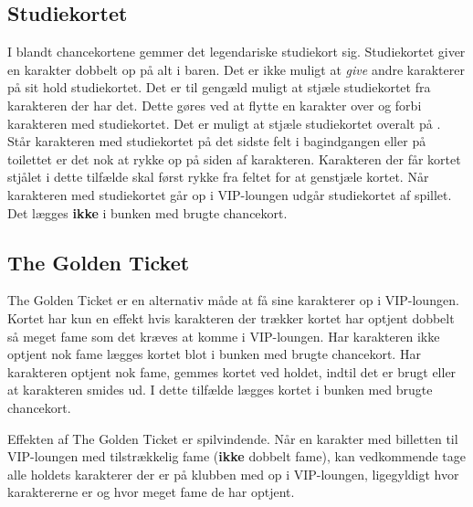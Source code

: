 \subsection{Studiekortet}
I blandt chancekortene gemmer det legendariske studiekort sig. Studiekortet giver en karakter dobbelt op på alt i baren. Det er ikke muligt at \textit{give} andre karakterer på sit hold studiekortet. Det er til gengæld muligt at stjæle studiekortet fra karakteren der har det. Dette gøres ved at flytte en karakter over og forbi karakteren med studiekortet. Det er muligt at stjæle studiekortet overalt på \LeClub . Står karakteren med studiekortet på det sidste felt i bagindgangen eller på toilettet er det nok at rykke op på siden af karakteren. Karakteren der får kortet stjålet i dette tilfælde skal først rykke fra feltet for at genstjæle kortet. Når karakteren med studiekortet går op i VIP-loungen udgår studiekortet af spillet. Det lægges \textbf{ikke} i bunken med brugte chancekort.
\subsection{The Golden Ticket}
The Golden Ticket er en alternativ måde at få sine karakterer op i VIP-loungen. Kortet har kun en effekt hvis karakteren der trækker kortet har optjent dobbelt så meget fame som det kræves at komme i VIP-loungen. Har karakteren ikke optjent nok fame lægges kortet blot i bunken med brugte chancekort. Har karakteren optjent nok fame, gemmes kortet ved holdet, indtil det er brugt eller at karakteren smides ud. I dette tilfælde lægges kortet i bunken med brugte chancekort. 

Effekten af The Golden Ticket er spilvindende. Når en karakter med billetten til VIP-loungen med tilstrækkelig fame (\textbf{ikke} dobbelt fame), kan vedkommende tage alle holdets karakterer der er på klubben med op i VIP-loungen, ligegyldigt hvor karaktererne er og hvor meget fame de har optjent. 
\raggedcolumns

